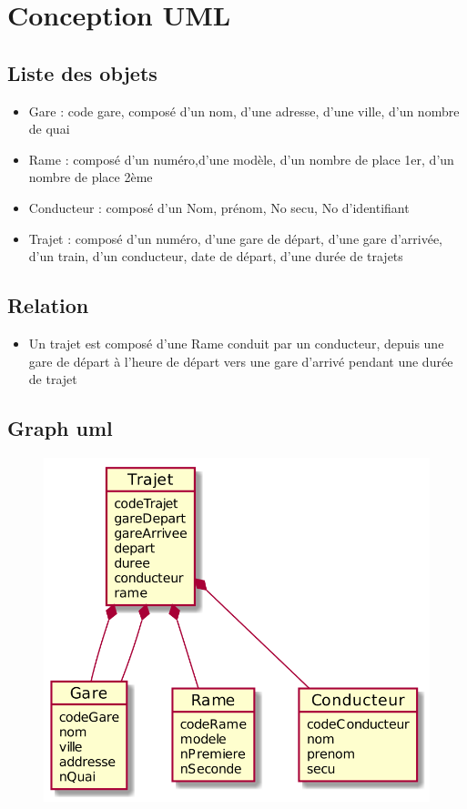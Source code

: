 ﻿\section{Conception UML}
\subsection{Liste des objets}
\begin{itemize}
\item Gare : code gare, composé d'un nom, d'une adresse, d'une ville, d'un nombre de quai
\item Rame : composé d'un numéro,d'une modèle, d'un nombre de place 1er, d'un nombre de place 2ème
\item Conducteur : composé d'un Nom, prénom, No secu, No d'identifiant

\item Trajet : composé d'un numéro, d'une gare de départ, d'une gare d'arrivée, d'un train, d'un conducteur, date de départ, d'une durée de trajets

\end{itemize}

\subsection{Relation}
\begin{itemize}
\item Un trajet est composé d'une Rame conduit par un conducteur, depuis une gare de départ à l'heure de départ vers une gare d'arrivé pendant une durée de trajet
\end{itemize}
\subsection{Graph uml}
\begin{figure}[h]
   \includegraphics[width=1.0\textwidth]{uml.png}
\end{figure}
